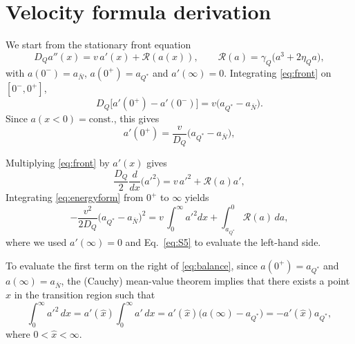\documentclass[superscriptaddress,amsmath,floatfix,aps,prc,twocolumn]{revtex4-1}
\newcommand{\aQstar}{\ensuremath{a_{Q^*}}}
\newcommand{\Nbar}{{\ensuremath{\bar N}}}
\begin{document}
\section{Velocity formula derivation}\label{sec:v_analytical_derivation}

We start from the stationary front equation
\begin{equation}
    D_Q a''(x) = v\,a'(x) + \mathcal{R}(a(x)),
    \qquad
    \mathcal{R}(a) = \gamma_Q\bigl(a^3 + 2\eta_Q a\bigr),
    \label{eq:front}
\end{equation}
with $a(0^-)=a_\Nbar$, $a(0^+)=\aQstar$ and $a'(\infty)=0$.
Integrating \eqref{eq:front} on $[0^-,0^+]$,
\begin{equation}
    D_Q\bigl[a'(0^+) - a'(0^-)\bigr]
    = v\bigl(\aQstar-a_\Nbar\bigr).
\end{equation}
Since $a(x<0)=\mathrm{const.}$, this gives
\begin{equation}
    a'(0^+) = \frac{v}{D_Q}\bigl(\aQstar-a_\Nbar\bigr),
    \label{eq:S5}
\end{equation}

Multiplying \eqref{eq:front} by $a'(x)$ gives
\begin{equation}
    \frac{D_Q}{2}\frac{d}{dx}\bigl(a'^2\bigr)
    = v\,a'^2 + \mathcal{R}(a)a',
    \label{eq:energyform}
\end{equation}
Integrating \eqref{eq:energyform} from $0^+$ to $\infty$ yields
\begin{equation}
    -\frac{v^2}{2D_Q}\bigl(\aQstar-a_\Nbar\bigr)^2
    = v\,\int_{0}^{\infty}a'^2dx
      +\int^{0}_{\aQstar}\mathcal{R}(a)\,da,
    \label{eq:balance}
\end{equation}
where we used $a'(\infty)=0$ and Eq.~\eqref{eq:S5} to evaluate the left-hand side.

To evaluate the first term on the right of \eqref{eq:balance}, since $a(0^+)=\aQstar$ and
$a(\infty)=a_\Nbar$, the (Cauchy) mean-value theorem implies that there exists a point
$\hat{x}$ in the transition region such that
\begin{equation}
    \int_{0}^{\infty} a'^2\,dx
    = a'(\hat{x})\int_{0}^{\infty} a'\,dx
    = a'(\hat{x})\big(a(\infty) - \aQstar\big) 
    = -a'(\hat{x})\aQstar ,
    \label{eq:MVT_step}
\end{equation}
where $0<\hat{x}<\infty$.
\end{document}
